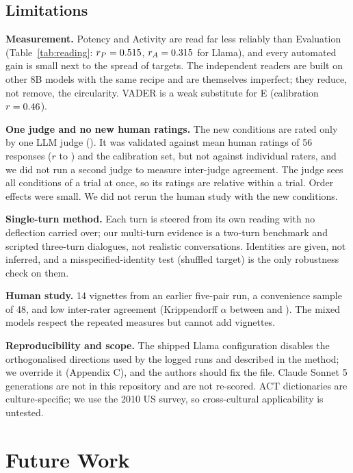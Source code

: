 \documentclass[letterpaper]{article} %
\begin{document}
\subsection{Limitations}

\textbf{Measurement.} Potency and Activity are read far less reliably than Evaluation (Table~\ref{tab:reading}: $r_P = 0.515$, $r_A = 0.315$ for Llama), and every automated gain is small next to the spread of targets. The independent readers are built on other 8B models with the same recipe and are themselves imperfect; they reduce, not remove, the circularity. VADER is a weak substitute for E (calibration $r = 0.46$).

\textbf{One judge and no new human ratings.} The new conditions are rated only by one LLM judge (\JudgeModel). It was validated against mean human ratings of 56 responses ($r$ \JdHumCR{} to \JdHumAR) and the calibration set, but not against individual raters, and we did not run a second judge to measure inter-judge agreement. The judge sees all conditions of a trial at once, so its ratings are relative within a trial. Order effects were small. We did not rerun the human study with the new conditions.

\textbf{Single-turn method.} Each turn is steered from its own reading with no deflection carried over; our multi-turn evidence is a two-turn benchmark and scripted three-turn dialogues, not realistic conversations. Identities are given, not inferred, and a misspecified-identity test (shuffled target) is the only robustness check on them.

\textbf{Human study.} 14 vignettes from an earlier five-pair run, a convenience sample of 48, and low inter-rater agreement (Krippendorff $\alpha$ between \HumanNaturalAlpha{} and \HumanNonSycAlpha{}). The mixed models respect the repeated measures but cannot add vignettes.

\textbf{Reproducibility and scope.} The shipped Llama configuration disables the orthogonalised directions used by the logged runs and described in the method; we override it (Appendix C), and the authors should fix the file. Claude Sonnet 5 generations are not in this repository and are not re-scored. ACT dictionaries are culture-specific; we use the 2010 US survey, so cross-cultural applicability is untested.

\section{Future Work}
\end{document}
